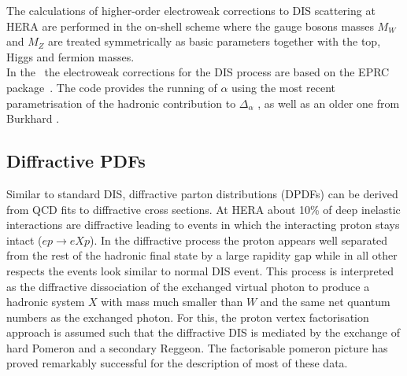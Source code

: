 The calculations of higher-order electroweak corrections to DIS scattering at 
HERA are performed in the on-shell scheme where the gauge bosons masses $M_W$ and 
$M_Z$ are treated symmetrically as basic parameters together with the top, Higgs 
and fermion masses.
\\
In the \fitter\, the electroweak corrections 
for the DIS process are based on the EPRC package~\cite{SpiesbergerPrivComm}.
The code provides the running of $\alpha$ using the most recent parametrisation
of the hadronic contribution to $\Delta_\alpha$ \cite{Jegerlehner}, as well as 
an older one from Burkhard \cite{Burkhard}.


\subsection{Diffractive PDFs}

\newcommand{\asotp}{\ensuremath{\frac{\alpha_{\rm s}}{2\pi}}}
\newcommand{\Sgl}[1]{\ensuremath{\tilde f_{#1+}}}
\newcommand{\Pom}{{I\!P}}
\newcommand{\Reg}{{I\!R}}
\newcommand{\xpom}{$x_{I\!P}$}


Similar to standard DIS, diffractive parton distributions (DPDFs) 
can be derived from QCD fits to diffractive cross sections.
At HERA about 10\% of deep inelastic interactions are diffractive leading to
events in which the interacting proton stays intact ($ep\to eXp$). 
In the diffractive process the proton appears well separated from the 
rest of the hadronic final state by a large rapidity gap  
while in all other respects the events look similar to normal DIS event.
This process is interpreted as the diffractive dissociation 
of the exchanged virtual photon to produce a hadronic system $X$ with mass much 
smaller than $W$ and the same net quantum numbers as the exchanged photon.
For this, the proton vertex factorisation approach
is assumed such that  the diffractive DIS is mediated by the exchange of hard Pomeron and a
secondary Reggeon.  The factorisable pomeron picture has proved remarkably successful for the description of most of these data.
%

